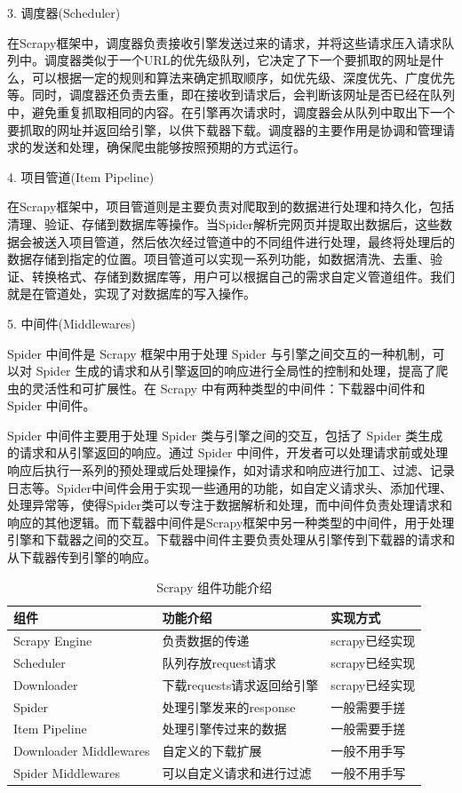 \documentclass[12pt,hyperref,a4paper,UTF8]{ctexart}
\begin{document}
3. 调度器(Scheduler)

在Scrapy框架中，调度器负责接收引擎发送过来的请求，并将这些请求压入请求队列中。调度器类似于一个URL的优先级队列，它决定了下一个要抓取的网址是什么，可以根据一定的规则和算法来确定抓取顺序，如优先级、深度优先、广度优先等。同时，调度器还负责去重，即在接收到请求后，会判断该网址是否已经在队列中，避免重复抓取相同的内容。在引擎再次请求时，调度器会从队列中取出下一个要抓取的网址并返回给引擎，以供下载器下载。调度器的主要作用是协调和管理请求的发送和处理，确保爬虫能够按照预期的方式运行。

4. 项目管道(Item Pipeline)

在Scrapy框架中，项目管道则是主要负责对爬取到的数据进行处理和持久化，包括清理、验证、存储到数据库等操作。当Spider解析完网页并提取出数据后，这些数据会被送入项目管道，然后依次经过管道中的不同组件进行处理，最终将处理后的数据存储到指定的位置。项目管道可以实现一系列功能，如数据清洗、去重、验证、转换格式、存储到数据库等，用户可以根据自己的需求自定义管道组件。我们就是在管道处，实现了对数据库的写入操作。

5. 中间件(Middlewares)

Spider 中间件是 Scrapy 框架中用于处理 Spider 与引擎之间交互的一种机制，可以对 Spider 生成的请求和从引擎返回的响应进行全局性的控制和处理，提高了爬虫的灵活性和可扩展性。在 Scrapy 中有两种类型的中间件：下载器中间件和 Spider 中间件。

Spider 中间件主要用于处理 Spider 类与引擎之间的交互，包括了 Spider 类生成的请求和从引擎返回的响应。通过 Spider 中间件，开发者可以处理请求前或处理响应后执行一系列的预处理或后处理操作，如对请求和响应进行加工、过滤、记录日志等。Spider中间件会用于实现一些通用的功能，如自定义请求头、添加代理、处理异常等，使得Spider类可以专注于数据解析和处理，而中间件负责处理请求和响应的其他逻辑。而下载器中间件是Scrapy框架中另一种类型的中间件，用于处理引擎和下载器之间的交互。下载器中间件主要负责处理从引擎传到下载器的请求和从下载器传到引擎的响应。

\begin{table}[h]
\centering
\begin{tabular}{@{}lll@{}}
\toprule
\textbf{组件} & \textbf{功能介绍} & \textbf{实现方式} \\ 
\midrule
Scrapy Engine & 负责数据的传递 & scrapy已经实现 \\
Scheduler & 队列存放request请求 & scrapy已经实现 \\
Downloader & 下载requests请求返回给引擎 & scrapy已经实现 \\
Spider & 处理引擎发来的response & 一般需要手搓 \\
Item Pipeline & 处理引擎传过来的数据 & 一般需要手搓 \\
Downloader Middlewares & 自定义的下载扩展 & 一般不用手写 \\
Spider Middlewares & 可以自定义请求和进行过滤 & 一般不用手写 \\
\bottomrule
\end{tabular}
\caption{Scrapy 组件功能介绍}
\label{tab:scrapy_components}
\end{table}
\end{document}
